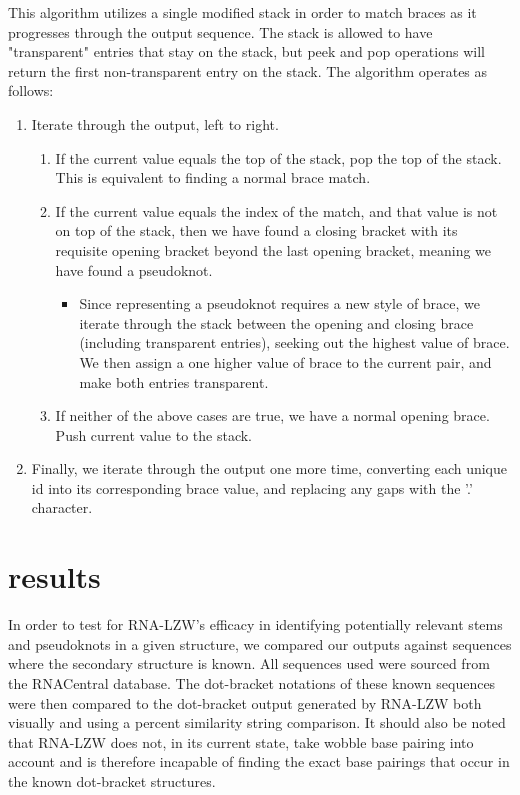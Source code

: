 \documentclass[sigconf]{acmart}
\begin{document}
This algorithm utilizes a single modified stack in order to match braces as it progresses through the output sequence. The stack is allowed to have "transparent" entries that stay on the stack, but peek and pop operations will return the first non-transparent entry on the stack. The algorithm operates as follows:
\begin{enumerate}
	\item Iterate through the output, left to right.
		\begin{enumerate}
		\item If the current value equals the top of the stack, pop the top of the stack. This is equivalent to finding a normal brace match.
		\item If the current value equals the index of the match, and that value is not on top of the stack, then we have found a closing bracket with its requisite opening bracket beyond the last opening bracket, meaning we have found a pseudoknot.
			\begin{itemize}
			\item Since representing a pseudoknot requires a new style of brace, we iterate through the stack between the opening and closing brace (including transparent entries), seeking out the highest value of brace. We then assign a one higher value of brace to the current pair, and make both entries transparent. 
			\end{itemize}
		\item If neither of the above cases are true, we have a normal opening brace. Push current value to the stack.
		\end{enumerate}


	\item Finally, we iterate through the output one more time, converting each unique id into its corresponding brace value, and replacing any gaps with the '.' character.
\end{enumerate}

\section{results}

In order to test for RNA-LZW's efficacy in identifying potentially relevant stems and pseudoknots in a given structure, we compared our outputs against sequences where the secondary structure is known.  All sequences used were sourced from the RNACentral database. The dot-bracket notations of these known sequences were then compared to the dot-bracket output generated by RNA-LZW both visually and using a percent similarity string comparison. It should also be noted that RNA-LZW does not, in its current state, take wobble base pairing into account and is therefore incapable of finding the exact base pairings that occur in the known dot-bracket structures. 
\end{document}
